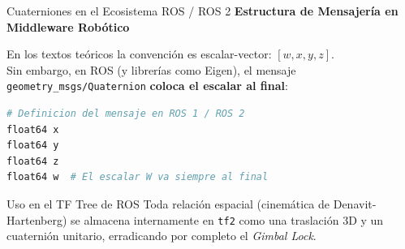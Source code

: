 \documentclass[aspectratio=169]{beamer}
\begin{document}
\begin{frame}[fragile]{Cuaterniones en el Ecosistema ROS / ROS 2}
    \textbf{Estructura de Mensajería en Middleware Robótico}
    \vspace{0.2cm}
    
    En los textos teóricos la convención es escalar-vector: $[w, x, y, z]$.\\
    Sin embargo, en ROS (y librerías como Eigen), el mensaje \texttt{geometry\_msgs/Quaternion} \textbf{coloca el escalar al final}:
    
\begin{lstlisting}[language=Python]
# Definicion del mensaje en ROS 1 / ROS 2
float64 x
float64 y
float64 z
float64 w  # El escalar W va siempre al final
\end{lstlisting}

    \vspace{0.3cm}
    \begin{exampleblock}{Uso en el TF Tree de ROS}
        Toda relación espacial (cinemática de Denavit-Hartenberg) se almacena internamente en \texttt{tf2} como una traslación 3D y un cuaternión unitario, erradicando por completo el \textit{Gimbal Lock}.
    \end{exampleblock}
\end{frame}
\end{document}

